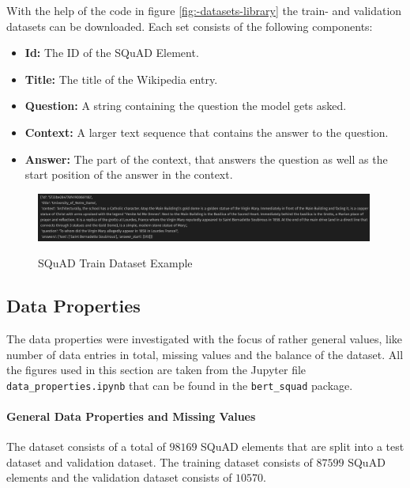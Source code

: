             With the help of the code in figure \ref{fig:-datasets-library} the train- and validation datasets can be downloaded.
            Each set consists of the following components:
            \begin{itemize}
                \item \textbf{Id:} The ID of the SQuAD Element.
                \item \textbf{Title:} The title of the Wikipedia entry.
                \item \textbf{Question:} A string containing the question the model gets asked.
                \item \textbf{Context:} A larger text sequence that contains the answer to the question.
                \item \textbf{Answer:} The part of the context, that answers the question as well as the start position of the answer in the context.
            \end{itemize}

            \begin{figure}
                \centering
                \caption{SQuAD Train Dataset Example}
                \includegraphics[width=0.99\textwidth]{figures/train_dataset_example.png}
                \label{fig:-train-dataset-example}
            \end{figure}

        \subsection{Data Properties}
        \label{subsec:-data-properties}

            The data properties were investigated with the focus of rather general values, like number of data entries in total, missing values and the balance of the dataset. All the figures used in this section are taken from the Jupyter file \texttt{data\_properties.ipynb} that can be found in the \texttt{bert\_squad} package.
            
            \paragraph{General Data Properties and Missing Values}
            \label{par:-data-properties---missing-values}
                The dataset consists of a total of $98169$ SQuAD elements that are split into a test dataset and validation dataset. The training dataset consists of $87599$ SQuAD elements and the validation dataset consists of $10570$.

